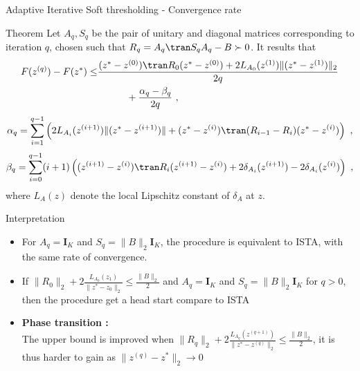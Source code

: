 \documentclass[defense.tex]{subfiles}
\begin{document}
\begin{frame}{Adaptive Iterative Soft thresholding - Convergence rate }

    \begin{block}{Theorem}
    Let $A_q, S_q$ be the pair of unitary and diagonal matrices corresponding to iteration $q$, 
chosen such that $R_q = A_q\tran S_q A_q - B \succ 0$.
It results that
{\small 
\begin{equation*}
\label{zo1}
	\begin{split}
		F(z^{(q)}) - F(z^*) \leq &\frac{(z^*- z^{(0)})\tran R_0 (z^* - z^{(0)}) + 2 L_{A_0}(z^{(1)}) \|  (z^*-z^{(1)}) \|_2 }{2q}\\
			&\hskip3em + \frac{\alpha_q - \beta_q}{2q}~,
	\end{split}
\end{equation*}
\[\alpha_q = \sum_{i=1}^{q-1} \left(  2L_{A_i}(z^{(i+1)})\|(z^*-z^{(i+1)}) \| + (z^* - z^{(i)})\tran ( R_{i-1} - R_{i}) (z^* - z^{(i)}) \right)~,\]
\[\beta_q = \sum_{i=0}^{q-1} (i+1)\left((z^{(i+1)}-z^{(i)})\tran R_i (z^{(i+1)}-z^{(i)}) + 2\delta_{A_i}(z^{(i+1)}) - 2\delta_{A_i}(z^{(i)}) \right)~,\]}
where $L_A(z)$ denote the local Lipschitz constant of $\delta_A$ at $z$.
    \end{block}
\end{frame}

\begin{frame}{Interpretation}

	\begin{itemize}\itemsep2em
		\item For $A_q = \pmb I_K$ and $S_q = \|B\|_2 \pmb I_K$, the procedure is
		equivalent to ISTA, with the same rate of convergence.
		\item If $\displaystyle\|R_0\|_2 + 2 \frac{L_{A_0}(z_1)}{\|z^*-z_0\|_2} \le \frac{\|B\|_2}{2}$
			  and $A_q = \pmb I_K$ and $S_q = \|B\|_2 \pmb I_K$ for $q >0$, then the procedure get a
			  head start compare to ISTA
		\item {\bf Phase transition :}\\
		The upper bound is improved when
		$\displaystyle\|R_q\|_2 + 2 \frac{L_{A_q}(z^{(q+1)})}{\|z^*-z^{(q)}\|_2} \le \frac{\|B\|_2}{2}$,
		it is thus harder to gain as $\|z^{(q)} - z^*\|_2 \to 0$
	\end{itemize}
	
\end{frame}
\end{document}

